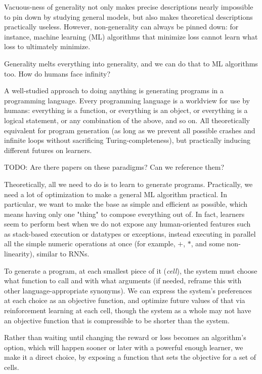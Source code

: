 \documentclass{article}
\begin{document}
Vacuous-ness of generality not only makes precise descriptions nearly impossible to pin down by studying general models, but also makes theoretical descriptions practically useless. However, non-generality can always be pinned down: for instance, machine learning (ML) algorithms that minimize loss cannot learn what loss to ultimately minimize.

Generality melts everything into generality, and we can do that to ML algorithms too. How do humans face infinity?

A well-studied approach to doing anything is generating programs in a programming language. Every programming language is a worldview for use by humans: everything is a function, or everything is an object, or everything is a logical statement, or any combination of the above, and so on. All theoretically equivalent for program generation (as long as we prevent all possible crashes and infinite loops without sacrificing Turing-completeness), but practically inducing different futures on learners.

    TODO: Are there papers on these paradigms? Can we reference them?

Theoretically, all we need to do is to learn to generate programs. Practically, we need a lot of optimization to make a general ML algorithm practical. In particular, we want to make the base as simple and efficient as possible, which means having only one "thing" to compose everything out of. In fact, learners seem to perform best when we do not expose any human-oriented features such as stack-based execution or datatypes or exceptions, instead executing in parallel all the simple numeric operations at once (for example, $+$, $*$, and some non-linearity), similar to RNNs.

To generate a program, at each smallest piece of it (\textit{cell}), the system must choose what function to call and with what arguments (if needed, reframe this with other language-appropriate synonyms). We can express the system's preferences at each choice as an objective function, and optimize future values of that via reinforcement learning at each cell, though the system as a whole may not have an objective function that is compressible to be shorter than the system.

Rather than waiting until changing the reward or loss becomes an algorithm's option, which will happen sooner or later with a powerful enough learner, we make it a direct choice, by exposing a function that sets the objective for a set of cells.
\end{document}
